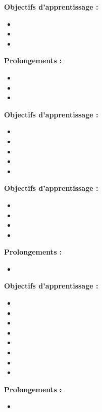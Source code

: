 \par\noindent\textbf{Objectifs d'apprentissage :}
\begin{itemize}
    \item \useobj[C3A3aa]
    \item \useobj[C3A3ab]
    \item \useobj[C3A3ac]
\end{itemize}
\par\noindent\textbf{Prolongements :}
\begin{itemize}
    \item \usepro[C3A3aa]
    \item \usepro[C3A3ab]
    \item \usepro[C3A3ac]
\end{itemize}
\endsequence

\par\noindent\textbf{Objectifs d'apprentissage :}
\begin{itemize}
    \item \useobj[C3A3bd]
    \item \useobj[C3A3be]
    \item \useobj[C3A3bh]
    \item \useobj[C3A3bi]
    \item \useobj[C3A3bj]
\end{itemize}
\endsequence

\par\noindent\textbf{Objectifs d'apprentissage :}
\begin{itemize}
    \item \useobj[C3A3aw]
    \item \useobj[C3A3ax]
    \item \useobj[C3A3bb]
    \item \useobj[C3A3bc]
\end{itemize}
\par\noindent\textbf{Prolongements :}
\begin{itemize}
    \item \usepro[C3A3ae]
\end{itemize}
\endsequence

\par\noindent\textbf{Objectifs d'apprentissage :}
\begin{itemize}
    \item \useobj[C3A3ad]
    \item \useobj[C3A3af]
    \item \useobj[C3A3ag]
    \item \useobj[C3A3ah]
    \item \useobj[C3A3ai]
    \item \useobj[C3A3aj]
    \item \useobj[C3A3am]
    \item \useobj[C3A3bf]
\end{itemize}
\par\noindent\textbf{Prolongements :}
\begin{itemize}
    \item \usepro[C3A3af]
\end{itemize}
\endsequence

